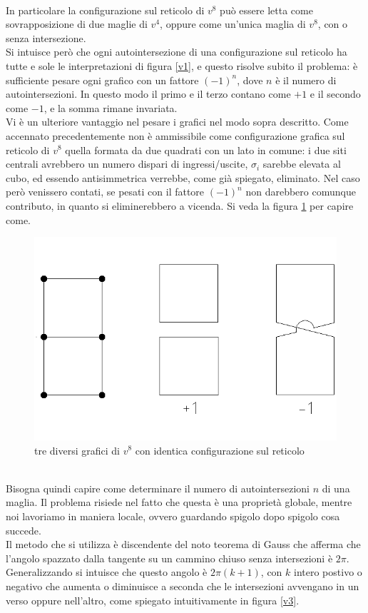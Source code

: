 \documentclass[11pt]{article}
\begin{document}
\\
In particolare la configurazione sul reticolo di $v^8$ può essere letta come sovrapposizione di due maglie di $v^4$, oppure come un'unica maglia di $v^8$, con o senza intersezione.\\
Si intuisce però che ogni autointersezione di una configurazione sul reticolo ha tutte e sole le interpretazioni di figura \ref{v1}, e questo risolve subito il problema: è sufficiente pesare ogni grafico con un fattore $(-1)^n$, dove $n$ è il numero di autointersezioni. In questo modo il primo e il terzo contano come $+1$ e il secondo come $-1$, e la somma rimane invariata.\\
Vi è un ulteriore vantaggio nel pesare i grafici nel modo sopra descritto. Come accennato precedentemente non è ammissibile come configurazione grafica sul reticolo di $v^8$ quella formata da due quadrati con un lato in comune: i due siti centrali avrebbero un numero dispari di ingressi/uscite, $\sigma_i$ sarebbe elevata al cubo, ed essendo antisimmetrica verrebbe, come già spiegato, eliminato. Nel caso però venissero contati, se pesati con il fattore $(-1)^n$ non darebbero comunque contributo, in quanto si eliminerebbero a vicenda. Si veda la figura \ref{v2} per capire come.
\begin{figure}[h]
\centering
\includegraphics[width=0.4\columnwidth]{v2}
\caption{tre diversi grafici di $v^8$ con identica configurazione sul reticolo}
\label{v2}
\end{figure}
\\
Bisogna quindi capire come determinare il numero di autointersezioni $n$ di una maglia. Il problema risiede nel fatto che questa è una proprietà globale, mentre noi lavoriamo in maniera locale, ovvero guardando spigolo dopo spigolo cosa succede. \\
Il metodo che si utilizza è discendente del noto teorema di Gauss che afferma che l'angolo spazzato dalla tangente su un cammino chiuso senza intersezioni è $2\pi$. Generalizzando si intuisce che questo angolo è $2\pi(k+1)$, con $k$ intero postivo o negativo che aumenta o diminuisce a seconda che le intersezioni avvengano in un verso oppure nell'altro, come spiegato intuitivamente in figura \ref{v3}.
\end{document}
